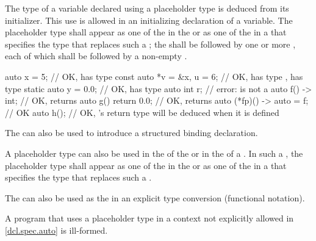 \pnum
The type of a variable declared using a placeholder type is
deduced from its initializer.
This use is allowed
in an initializing declaration of a variable.
The placeholder type shall appear as one of the
 in the 
or as one of the
 in a 
that specifies the type that replaces such a ;
the 
shall be followed by one or more
,
each of which shall
be followed by a non-empty
.
\begin{example}
\begin{codeblock}
auto x = 5;                     // OK,  has type 
const auto *v = &x, u = 6;      // OK,  has type ,  has type 
static auto y = 0.0;            // OK,  has type 
auto int r;                     // error:  is not a 
auto f() -> int;                // OK,  returns 
auto g() { return 0.0; }        // OK,  returns 
auto (*fp)() -> auto = f;       // OK
auto h();                       // OK, 's return type will be deduced when it is defined
\end{codeblock}
\end{example}
The  
can also be used to introduce
a structured binding declaration.

\pnum
A placeholder type can also be used
in the  of
the  or
in the  of a
.
In such a ,
the placeholder type shall appear
as one of the  in
the  or
as one of the  in
a 
that specifies the type that replaces such a .

\pnum
The   can also be used
as the 
in an explicit type conversion (functional notation).

\pnum
A program that uses a placeholder type in a context not
explicitly allowed in \ref{dcl.spec.auto} is ill-formed.

